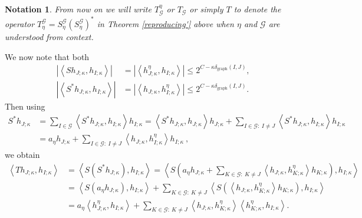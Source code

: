 \documentclass{amsart}%
\theoremstyle{plain}
\newtheorem{notation}[theorem]{Notation}
\numberwithin{equation}{section}
\begin{document}
\begin{notation}
From now on we will write $T_{\mathcal{G}}^{\eta}$ or $T_{\mathcal{G}}$ or
simply $T$ to denote the operator $T_{\eta}^{\mathcal{G}}=S_{\eta
}^{\mathcal{G}}\left(  S_{\eta}^{\mathcal{G}}\right)  ^{\ast}$ in Theorem
\ref{reproducing'} above when $\eta$ and $\mathcal{G}$ are understood from context.
\end{notation}

We now note that both%
\begin{align*}
\left\vert \left\langle Sh_{J;\kappa},h_{I;\kappa}\right\rangle \right\vert  &
=\left\vert \left\langle h_{J;\kappa}^{\eta},h_{I;\kappa}\right\rangle
\right\vert \leq2^{C-\kappa\delta_{\operatorname*{graph}}\left(  I,J\right)
},\\
\left\vert \left\langle S^{\ast}h_{J;\kappa},h_{I;\kappa}\right\rangle
\right\vert  & =\left\vert \left\langle h_{J;\kappa},h_{I;\kappa}^{\eta
}\right\rangle \right\vert \leq2^{C-\kappa\delta_{\operatorname*{graph}%
}\left(  I,J\right)  }.
\end{align*}
Then using
\begin{align*}
S^{\ast}h_{J;\kappa}  & =\sum_{I\in\mathcal{G}}\left\langle S^{\ast
}h_{J;\kappa},h_{I;\kappa}\right\rangle h_{I;\kappa}=\left\langle S^{\ast
}h_{J;\kappa},h_{J;\kappa}\right\rangle h_{J;\kappa}+\sum_{I\in\mathcal{G}%
:\ I\neq J}\left\langle S^{\ast}h_{J;\kappa},h_{I;\kappa}\right\rangle
h_{I;\kappa}\\
& =a_{\eta}h_{J;\kappa}+\sum_{I\in\mathcal{G}:\ I\neq J}\left\langle
h_{J;\kappa},h_{I;\kappa}^{\eta}\right\rangle h_{I;\kappa}\ ,
\end{align*}
we obtain%
\begin{align*}
\left\langle Th_{J;\kappa},h_{I;\kappa}\right\rangle  & =\left\langle S\left(
S^{\ast}h_{J;\kappa}\right)  ,h_{I;\kappa}\right\rangle =\left\langle S\left(
a_{\eta}h_{J;\kappa}+\sum_{K\in\mathcal{G}:\ K\neq J}\left\langle h_{J;\kappa
},h_{K;\kappa}^{\eta}\right\rangle h_{K;\kappa}\right)  ,h_{I;\kappa
}\right\rangle \\
& =\left\langle S\left(  a_{\eta}h_{J;\kappa}\right)  ,h_{I;\kappa
}\right\rangle +\sum_{K\in\mathcal{G}:\ K\neq J}\left\langle S\left(
\left\langle h_{J;\kappa},h_{K;\kappa}^{\eta}\right\rangle h_{K;\kappa
}\right)  ,h_{I;\kappa}\right\rangle \\
& =a_{\eta}\left\langle h_{J;\kappa}^{\eta},h_{I;\kappa}\right\rangle
+\sum_{K\in\mathcal{G}:\ K\neq J}\left\langle h_{J;\kappa},h_{K;\kappa}^{\eta
}\right\rangle \left\langle h_{K;\kappa}^{\eta},h_{I;\kappa}\right\rangle .
\end{align*}
\end{document}
